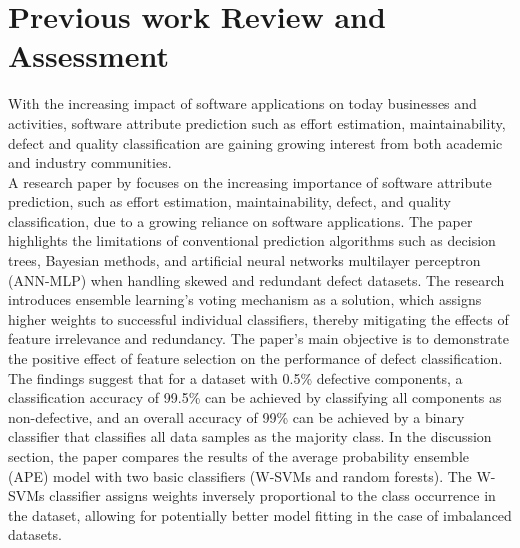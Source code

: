 \documentclass[12pt]{report}
\begin{document}
\chapter*{Previous work Review and Assessment}
With the increasing impact of software applications on today businesses and
activities, software attribute prediction such as effort estimation,
maintainability, defect and quality classification are gaining growing
interest from both academic and industry communities.\\

A research paper by\cite{LARADJI2015388} focuses on the increasing importance
of software attribute prediction, such as effort estimation, maintainability,
defect, and quality classification, due to a growing reliance on software
applications. The paper highlights the limitations of conventional prediction
algorithms such as decision trees, Bayesian methods, and artificial neural
networks multilayer perceptron (ANN-MLP) when handling skewed and redundant
defect datasets. The research introduces ensemble learning's voting mechanism
as a solution, which assigns higher weights to successful individual
classifiers, thereby mitigating the effects of feature irrelevance and
redundancy. The paper's main objective is to demonstrate the positive effect of
feature selection on the performance of defect classification. The findings
suggest that for a dataset with 0.5\% defective components, a classification
accuracy of 99.5\% can be achieved by classifying all components as
non-defective, and an overall accuracy of 99\% can be achieved by a binary
classifier that classifies all data samples as the majority class. In the
discussion section, the paper compares the results of the average probability
ensemble (APE) model with two basic classifiers (W-SVMs and random forests).
The W-SVMs classifier assigns weights inversely proportional to the class
occurrence in the dataset, allowing for potentially better model fitting in the
case of imbalanced datasets. \\
\end{document}
